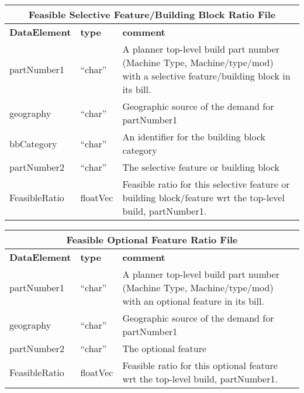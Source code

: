 \vspace{.5in}

\begin{tabular}{llp{4in}}
\multicolumn{3}{c}{{\bf Feasible Selective Feature/Building Block Ratio File}}\\ \hline\hline
{\bf DataElement} &  {\bf type}  &   {\bf comment} \\ \hline
partNumber1  & ``char'' &       A planner top-level build part number 
                            (Machine Type, Machine/type/mod)
                            with a selective feature/building block in its bill.  \\
geography   & ``char''    &      Geographic source of the demand for partNumber1 \\
bbCategory &  ``char'' &   An identifier for the building block category  \\
partNumber2  & ``char'' &      The selective feature or building block \\

FeasibleRatio    & floatVec &   Feasible ratio for this selective feature or 
                            building block/feature wrt the top-level build, partNumber1. \\
\end{tabular}

\vspace{.5in}

\begin{tabular}{llp{4in}}
\multicolumn{3}{c}{{\bf Feasible Optional Feature Ratio File}}\\ \hline\hline
{\bf DataElement} &  {\bf type}  &   {\bf comment} \\ \hline
partNumber1  & ``char'' &       A planner top-level build part number 
                            (Machine Type, Machine/type/mod)
                            with an optional feature in its bill.  \\
geography    & ``char'' &      Geographic source of the demand for partNumber1 \\
partNumber2  & ``char'' &      The optional feature \\

FeasibleRatio    & floatVec &   Feasible ratio for this optional feature wrt
                        the top-level build, partNumber1. \\
\end{tabular}

\vspace{.5in}

